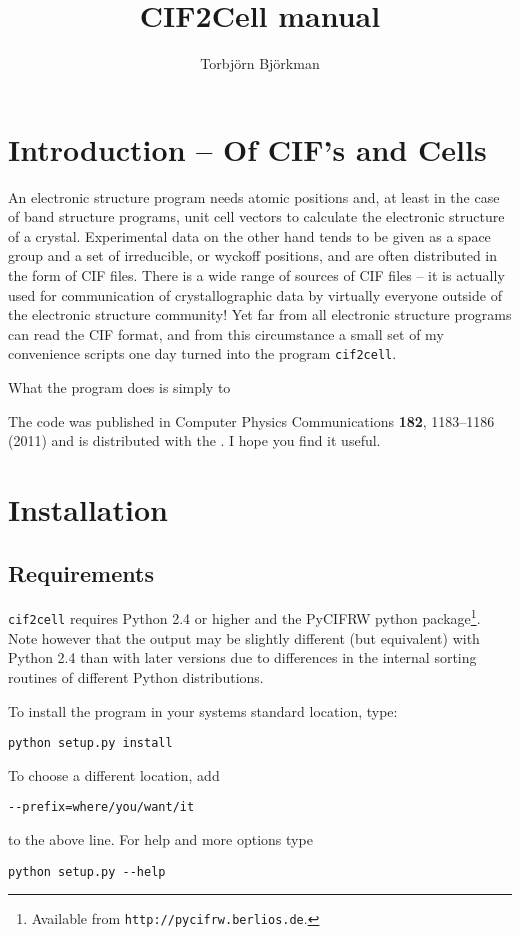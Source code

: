 \documentclass[11pt]{article}
\title{CIF2Cell manual}
\author{Torbj\"orn Bj\"orkman}
\newcommand{\ciftocell}{\texttt{cif2cell}}
\begin{document}
\maketitle
\section*{Introduction -- Of CIF's and Cells}
An electronic structure program needs atomic positions and, at least in the case of band structure programs, unit cell vectors to calculate the electronic structure of a crystal. Experimental data on the other hand tends to be given as a space group and a set of irreducible, or wyckoff positions, and are often distributed in the form of CIF files. There is a wide range of sources of CIF files -- it is actually used for communication of crystallographic data by virtually everyone outside of the electronic structure community! Yet far from all electronic structure programs can read the CIF format, and from this circumstance a small set of my convenience scripts one day turned into the program \ciftocell.

What the program does is simply to 

The code was published in Computer Physics Communications {\bf 182}, 1183--1186 (2011) and is distributed with the . I hope you find it useful.

\newpage
\section{Installation}
\subsection{Requirements}
\ciftocell{} requires Python 2.4 or higher and the PyCIFRW python package\footnote{Available from \texttt{http://pycifrw.berlios.de}.}. Note however that the output may be slightly different (but equivalent) with Python 2.4 than with later versions due to differences in the internal sorting routines of different Python distributions.

To install the program in your systems standard location, type:
\begin{verbatim}
python setup.py install 
\end{verbatim}
To choose a different location, add 
\begin{verbatim}
--prefix=where/you/want/it 
\end{verbatim}
to the above line. For help and more options type
\begin{verbatim}
python setup.py --help
\end{verbatim}
\end{document}
